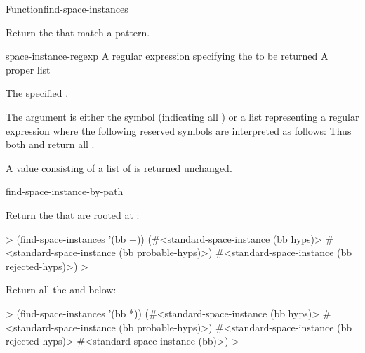 \documentclass[10pt,twoside,english,pdftex]{article}
\begin{document}
\begin{functiondoc}{Function}{find-space-instances}%
  {
    \returns{} }

\fnsyntax

\fnpurpose Return the  that match a
 pattern.

\fnpackage {}

\fnmodule {}

\fnargs
\begin{args}{space-instance-regexp}
 A  regular expression
specifying the  to be returned 
 A proper list
\end{args}

\fnreturns The specified .

\fndescription 
{}%
The  argument is either the symbol
 (indicating all ) or a list
representing a regular expression where the following reserved symbols
are interpreted as follows: 
\spaceinstanceregexp
Thus both  and
 return all .

A  value consisting of a list of
 is returned unchanged.

\begin{alsos}{find-space-instance-by-path}
\end{alsos}

\fnexamples
Return the  that are rooted at :
%
\W\supp
\begin{example}
  > (find-space-instances '(bb +))
  (#<standard-space-instance (bb hyps)>
   #<standard-space-instance (bb probable-hyps)>)
   #<standard-space-instance (bb rejected-hyps)>)
  >
\end{example}
%
Return all the   and below:
%
\W\supp\notpretop
\begin{example}
  > (find-space-instances '(bb *))
  (#<standard-space-instance (bb hyps)>
   #<standard-space-instance (bb probable-hyps)>)
   #<standard-space-instance (bb rejected-hyps)>
   #<standard-space-instance (bb)>)
  >
\end{example}

\end{functiondoc}
\end{document}
